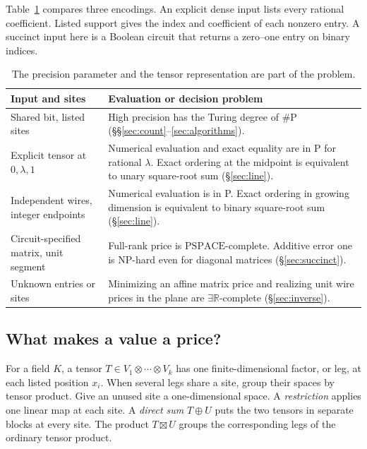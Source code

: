 \documentclass[11pt,letterpaper]{article}
\theoremstyle{definition}
\newcommand{\R}{\mathbb R}
\newcommand{\sharpP}{\#\mathrm P}
\newcommand{\PSPACE}{\mathrm{PSPACE}}
\newcommand{\etr}{\exists\R}
\begin{document}
Table~\ref{tab:inputs} compares three encodings. An explicit dense input
lists every rational coefficient. Listed support gives the index and
coefficient of each nonzero entry. A succinct input here is a Boolean
circuit that returns a zero--one entry on binary indices.

\begin{table}[htbp]
\centering\small
\begin{tabularx}{\linewidth}{@{}p{.38\linewidth}X@{}}
\toprule
Input and sites & Evaluation or decision problem\\
\midrule
Shared bit, listed sites & High precision has the Turing degree of \(\sharpP\)
(\S\S\ref{sec:count}--\ref{sec:algorithms}).\\
Explicit tensor at \(0,\lambda,1\) & Numerical evaluation and exact equality
are in P for rational \(\lambda\). Exact ordering at the midpoint is equivalent
to unary square-root sum (\S\ref{sec:line}).\\
Independent wires, integer endpoints & Numerical evaluation is in P.
Exact ordering in growing dimension is equivalent to binary square-root sum
(\S\ref{sec:line}).\\
Circuit-specified matrix, unit segment & Full-rank price is \(\PSPACE\)-complete.
Additive error one is NP-hard even for diagonal matrices (\S\ref{sec:succinct}).\\
Unknown entries or sites & Minimizing an affine matrix price and realizing unit
wire prices in the plane are \(\etr\)-complete (\S\ref{sec:inverse}).\\
\bottomrule
\end{tabularx}
\caption{The precision parameter and the tensor representation are part of the problem.}
\label{tab:inputs}
\end{table}

\subsection*{What makes a value a price?}
For a field \(K\), a tensor \(T\in V_1\otimes\cdots\otimes V_k\) has one
finite-dimensional factor, or leg, at each listed position \(x_i\).
When several legs share a site, group their spaces by tensor product. Give
an unused site a one-dimensional space. A \emph{restriction} applies one
linear map at each site. A \emph{direct sum} \(T\oplus U\) puts the two
tensors in separate blocks at every site. The product \(T\boxtimes U\)
groups the corresponding legs of the ordinary tensor product.
\end{document}
